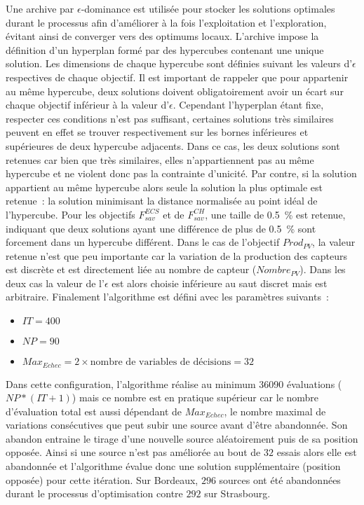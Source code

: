 Une archive par $\epsilon$-dominance est utilisée pour stocker les solutions optimales
durant le processus afin d’améliorer à la fois l’exploitation et l’exploration, évitant
ainsi de converger vers des optimums locaux. L’archive impose la définition d’un
hyperplan formé par des hypercubes contenant une unique solution. Les dimensions de chaque
hypercube sont définies suivant les valeurs d’$\epsilon$ respectives de chaque objectif.
Il est important de rappeler que pour appartenir au même hypercube, deux solutions
doivent obligatoirement avoir un écart sur chaque objectif inférieur à la valeur d’$\epsilon$.
Cependant l’hyperplan étant fixe, respecter ces conditions n’est pas suffisant, certaines solutions
très similaires peuvent en effet se trouver respectivement sur les bornes inférieures
et supérieures de deux hypercube adjacents. Dans ce cas, les deux solutions sont retenues
car bien que très similaires, elles n’appartiennent pas au même hypercube et ne violent donc
pas la contrainte d’unicité.
Par contre, si la solution appartient au même hypercube alors seule la solution la plus
optimale est retenue~: la solution minimisant la distance normalisée au point idéal de l’hypercube.
Pour les objectifs $F_{sav}^{ECS}$ et de $F_{sav}^{CH}$, une taille de \SI{0.5}{\percent}
est retenue, indiquant que deux solutions ayant une différence de plus de
\SI{0.5}{\percent} sont forcement dans un hypercube différent. Dans le cas de l’objectif $Prod_{PV}$, la
valeur retenue n’est que peu importante car la variation de la production des capteurs
 est discrète et est directement liée au nombre de capteur  ($Nombre_{PV}$).
Dans les deux cas la valeur de l’$\epsilon$ est alors choisie inférieure au saut discret
mais est arbitraire. Finalement l’algorithme est défini avec les paramètres suivants~:
\begin{itemize}
  \item $IT = 400$
  \item $NP = 90$
  \item $Max_{Echec} = 2 \times \text{nombre de variables de décisions} = 32$
\end{itemize}

Dans cette configuration, l’algorithme réalise au minimum \num{36090} évaluations ($NP *
(IT + 1)$) mais ce nombre est en pratique supérieur car le nombre d’évaluation total est aussi
dépendant de $Max_{Echec}$, le nombre maximal de variations consécutives que peut subir
une source avant d’être abandonnée. Son abandon entraine le tirage d’une nouvelle source
aléatoirement puis de sa position opposée. Ainsi si une source n’est pas améliorée au bout
de $32$ essais alors elle est abandonnée et l’algorithme évalue donc une solution
supplémentaire (position opposée) pour cette itération. Sur Bordeaux, $296$ sources ont
été abandonnées durant le processus d’optimisation contre $292$ sur Strasbourg.

